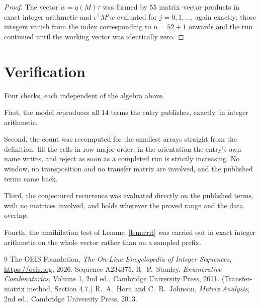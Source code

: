 \documentclass[11pt,a4paper]{article}
\theoremstyle{plain}
\theoremstyle{definition}
\begin{document}
\begin{proof}
The vector $w=q(M)\tau$ was formed by $55$ matrix--vector products in exact integer
arithmetic and $\iota^{\!\top}M^{j}w$ evaluated for $j=0,1,\dots$, again exactly; those
integers vanish from the index corresponding to $n=52+1$ onwards and the run continued
until the working vector was identically zero.
\end{proof}

\section{Verification}

Four checks, each independent of the algebra above.

First, the model reproduces all $14$ terms the entry publishes, exactly, in integer
arithmetic.

Second, the count was recomputed for the smallest arrays straight from the definition: fill the
cells in row major order, in the orientation the entry's own name writes, and reject as soon as
a completed run is strictly increasing. No window, no transposition and no transfer matrix are involved, and
the published terms came back.

Third, the conjectured recurrence was evaluated directly on the published terms, with no
matrices involved, and holds wherever the proved range and the data overlap.

Fourth, the annihilation test of Lemma~\ref{lem:crit} was carried out in exact integer
arithmetic on the whole vector rather than on a sampled prefix.

\begin{thebibliography}{9}
 The OEIS Foundation, \emph{The On-Line Encyclopedia of Integer
Sequences}, \url{https://oeis.org}, 2026. Sequence A234375.
 R.~P.~Stanley, \emph{Enumerative Combinatorics}, Volume 1, 2nd ed.,
Cambridge University Press, 2011. (Transfer-matrix method, Section 4.7.)
 R.~A.~Horn and C.~R.~Johnson, \emph{Matrix Analysis}, 2nd ed., Cambridge
University Press, 2013.
\end{thebibliography}
\end{document}
